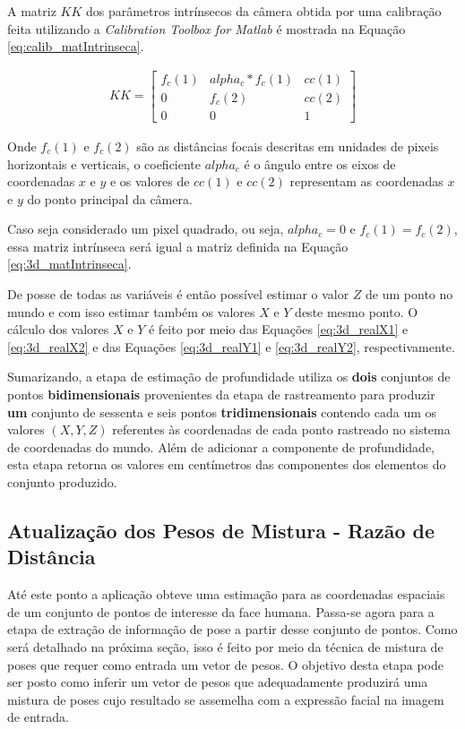 A matriz $KK$ dos parâmetros intrínsecos da câmera obtida por uma calibração
feita utilizando a \textit{Calibration Toolbox for Matlab} é mostrada na Equação
\ref{eq:calib_matIntrinseca}.

\begin{align}
KK =
\left[\begin{array}{ccc}
f_c(1) & alpha_c*f_c(1) & cc(1)\\
0 & f_c(2) & cc(2)\\
0 & 0 & 1
\end{array}\right]
\label{eq:calib_matIntrinseca}
\end{align}

Onde $f_c(1)$ e $f_c(2)$ são as distâncias focais descritas em unidades de
pixeis horizontais e verticais, o coeficiente $alpha_c$ é o ângulo entre os
eixos de coordenadas $x$ e $y$ e os valores de $cc(1)$ e $cc(2)$ representam as
coordenadas $x$ e $y$ do ponto principal da câmera.

Caso seja considerado um pixel quadrado, ou seja, $alpha_c = 0$ e $f_c(1) =
f_c(2)$, essa matriz intrínseca será igual a matriz definida na Equação
\ref{eq:3d_matIntrinseca}.

De posse de todas as variáveis é então possível estimar o valor $Z$ de um ponto
no mundo e com isso estimar também os valores $X$ e $Y$ deste mesmo ponto. O
cálculo dos valores $X$ e $Y$ é feito por meio das Equações \ref{eq:3d_realX1} e
\ref{eq:3d_realX2} e das Equações \ref{eq:3d_realY1} e \ref{eq:3d_realY2},
respectivamente.    

Sumarizando, a etapa de estimação de profundidade utiliza os \textbf{dois}
conjuntos de pontos \textbf{bidimensionais} provenientes da etapa de
rastreamento para produzir \textbf{um} conjunto de sessenta e seis pontos
\textbf{tridimensionais} contendo cada um os valores $(X,Y,Z)$ referentes às
coordenadas de cada ponto rastreado no sistema de coordenadas do mundo. Além de
adicionar a componente de profundidade, esta etapa retorna os valores em
centímetros das componentes dos elementos do conjunto produzido.

\subsection{Atualização dos Pesos de Mistura - Razão de Distância}

Até este ponto a aplicação obteve uma estimação para as coordenadas espaciais de
um conjunto de pontos de interesse da face humana. Passa-se agora para a etapa
de extração de informação de pose a partir desse conjunto de pontos. Como será
detalhado na próxima seção, isso é feito por meio da técnica de mistura de poses
que requer como entrada um vetor de pesos. O objetivo desta etapa pode ser posto
como inferir um vetor de pesos que adequadamente produzirá uma mistura de poses
cujo resultado se assemelha com a expressão facial na imagem de entrada.

